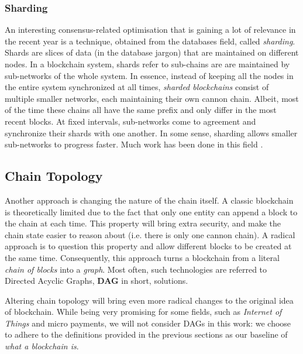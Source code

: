 \subsubsection{Sharding}

An interesting consensus-related optimisation that is gaining a lot of relevance in the recent year
is a technique, obtained from the databases field, called \textit{sharding}. Shards are slices of
data (in the database jargon) that are maintained on different nodes. In a blockchain system, shards
refer to sub-chains are are maintained by sub-networks of the whole system. In essence, instead of
keeping all the nodes in the entire system synchronized at all times, \textit{sharded blockchains}
consist of multiple smaller networks, each maintaining their own cannon chain. Albeit, most of the
time these chains all have the same prefix and only differ in the most recent blocks. At fixed
intervals, sub-networks come to agreement and synchronize their shards with one another. In some
sense, sharding allows smaller sub-networks to progress faster. Much work has been done in this
field \cite{Forestier_Vodenicarevic_Laversanne_Finot_2019_block_qlique,
Al_Bassam_Sonnino_Bano_Hrycyszyn_Danezis_2017_chainspace,
Shrey_Singh_Sathya_Yogesh_2019_diep_trans}.

\subsection{Chain Topology}

Another approach is changing the nature of the chain itself. A classic blockchain is theoretically
limited due to the fact that only one entity can append a block to the chain at each time. This
property will bring extra security, and make the chain state easier to reason about (i.e. there is
only one cannon chain). A radical approach is to question this property and allow different blocks
to be created at the same time. Consequently, this approach turns a blockchain from a literal
\textit{chain of blocks} into a \textit{graph}. Most often, such technologies are referred to
Directed Acyclic Graphs, \textbf{DAG} in short, solutions.

Altering chain topology will bring even more radical changes to the original idea of blockchain.
While being very promising for some fields, such as \textit{Internet of Things} and micro payments, we
will not consider DAGs in this work: we choose to adhere to the definitions provided in the previous
sections as our baseline of \textit{what a blockchain is}.

